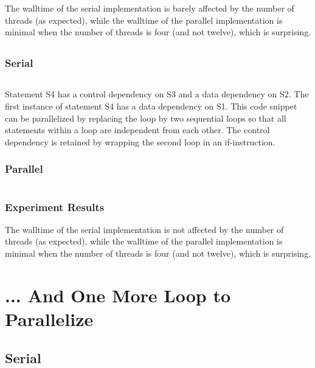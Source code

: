 \documentclass[parskip]{scrartcl}
\begin{document}
	The walltime of the serial implementation is barely affected by the number of threads (as expected), while the walltime of the parallel implementation is minimal when the number of threads is four (and not twelve), which is surprising.
	\subsection{}
	\subsubsection{Serial}
	\inputminted	[linenos]{c}{ex2/c_ser.h}
	
	Statement S4 has a control dependency on S3 and a data dependency on S2. The first instance of statement S4 has a data dependency on S1. This code snippet can be parallelized by replacing the loop by two sequential loops so that all statements within a loop are independent from each other. The control dependency is retained by wrapping the second loop in an if-instruction.
	\subsubsection{Parallel}
	\inputminted	[linenos]{c}{ex2/c_par.h}
	\subsubsection{Experiment Results}
	
	The walltime of the serial implementation is not affected by the number of threads (as expected), while the walltime of the parallel implementation is minimal when the number of threads is four (and not twelve), which is surprising.
	
	\section{... And One More Loop to Parallelize}
	\subsection{Serial}
	\inputminted	[linenos]{c}{ex3/serial.c}
\end{document}
